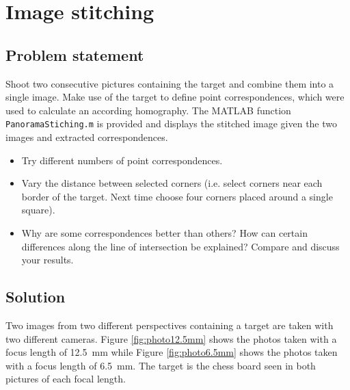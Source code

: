 \documentclass[
a4paper,     %
12pt         %
]{scrartcl}  %
\begin{document}

 \maketitle

 \tableofcontents
 \newpage

\section{Image stitching}

\subsection{Problem statement}

Shoot two consecutive pictures containing the target and combine them into a single image. Make use of the
target to define point correspondences, which were used to calculate an according homography. The MATLAB
function \texttt{PanoramaStiching.m} is provided and displays the stitched image given the two images and extracted
correspondences.

\begin{itemize}
 \item Try different numbers of point correspondences.
 \item Vary the distance between selected corners (i.e. select corners near each border of the target. Next time choose four corners placed around a single square).
 \item Why are some correspondences better than others? How can certain differences along the line of intersection be explained? Compare and discuss your results.
\end{itemize}

\subsection{Solution}

Two images from two different perspectives containing a target are taken with two different cameras.
Figure \ref{fig:photo12.5mm} shows the photos taken with a focus length of \SI{12.5}{mm} while Figure \ref{fig:photo6.5mm} shows the photos taken with a focus length of \SI{6.5}{mm}.
The target is the chess board seen in both pictures of each focal length.
\end{document}
